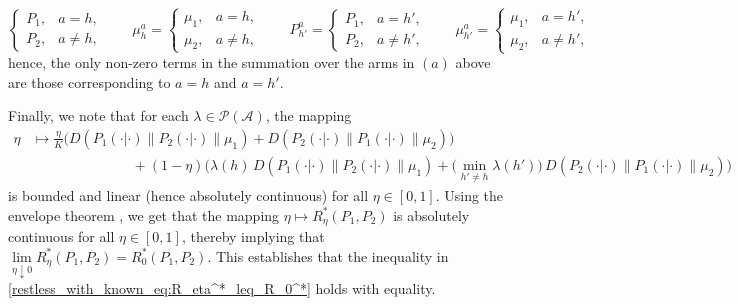 {\begin{equation}
\begin{cases}
		P_1,& a=h,\\
		P_2,& a\neq h,
	\end{cases} \qquad  \mu_h^a=\begin{cases}
		\mu_1,& a=h,\\
		\mu_2,& a\neq h,
	\end{cases}\qquad 
P_{h'}^a=\begin{cases}
		P_1,& a=h',\\
		P_2,& a\neq h',
	\end{cases} \qquad  \mu_{h'}^a=\begin{cases}
		\mu_1,& a=h',\\
		\mu_2,& a\neq h',
	\end{cases}
\end{equation} 
hence, the only non-zero terms in the summation over the arms in $(a)$ above are those corresponding to $a=h$ and $a=h'$.}

{\color{black} Finally, we note that for each $\lambda\in \mathcal{P}(\mathcal{A})$, the mapping 
\begin{align*}
\eta &\longmapsto \frac{\eta}{K}\bigg(D(P_1(\cdot|\cdot)\|P_2(\cdot|\cdot)\|\mu_1) + D(P_2(\cdot|\cdot)\|P_1(\cdot|\cdot)\|\mu_2)\bigg)\\
	&\hspace{3cm}+(1-\eta)\bigg(\lambda(h)\, D(P_1(\cdot|\cdot)\|P_2(\cdot|\cdot)\|\mu_1) + \bigg(\min\limits_{h'\neq h} \lambda(h')\bigg)\,D(P_2(\cdot|\cdot)\|P_1(\cdot|\cdot)\|\mu_2)\bigg)
\end{align*}
is bounded and linear (hence absolutely continuous) for all $\eta\in [0,1]$. Using the envelope theorem \cite[Theorem 2]{milgrom2002envelope}, we get that the mapping $\eta \mapsto R_\eta^*(P_1, P_2)$ is absolutely continuous for all $\eta\in [0,1]$, thereby implying that $\lim\limits_{\eta \downarrow 0} R_\eta^*(P_1,P_2)=R_0^*(P_1, P_2)$. This establishes that the inequality in \eqref{restless_with_known_eq:R_eta^*_leq_R_0^*} holds with equality.}


